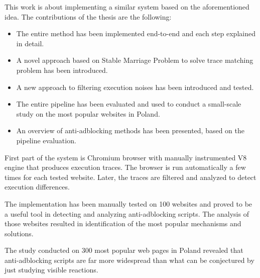 This work is about implementing a similar system based on the aforementioned idea.
The contributions of the thesis are the following:
\begin{itemize}
  \item The entire method has been implemented  
           end-to-end and each step explained in detail.
  \item A novel approach based on Stable Marriage Problem to solve trace matching problem
           has been introduced.
  \item A new approach to filtering execution noises has been introduced and tested.
  \item The entire pipeline has been evaluated and used to conduct a small-scale study on the most
           popular websites in Poland.
  \item An overview of anti-adblocking methods has been presented, based on the pipeline evaluation.
\end{itemize}

First part of the system is Chromium browser with manually instrumented V8 engine that produces
execution traces. The browser is run automatically a few times for each tested website.
Later, the traces are filtered and analyzed to detect execution differences.

The implementation has been manually tested on 100 websites and proved to be a useful tool 
in detecting and analyzing anti-adblocking scripts. 
The analysis of those websites resulted in identification of the most popular mechanisms and solutions.

The study conducted on 300 most popular web pages in Poland revealed that anti-adblocking scripts
are far more widespread than what can be conjectured by just studying visible reactions.
